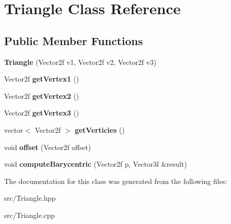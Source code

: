 \hypertarget{class_triangle}{}\section{Triangle Class Reference}
\label{class_triangle}
\subsection*{Public Member Functions}
\begin{DoxyCompactItemize}
\item 
\mbox{\label{class_triangle_ab7e2ea6c13f332ae1545455ab8a8fcec}} 
{\bfseries Triangle} (Vector2f v1, Vector2f v2, Vector2f v3)
\item 
\mbox{\label{class_triangle_acf9ed1087565f30c1958688b77e8fecc}} 
Vector2f {\bfseries get\+Vertex1} ()
\item 
\mbox{\label{class_triangle_aded502a5993f98594e7da89e789edd48}} 
Vector2f {\bfseries get\+Vertex2} ()
\item 
\mbox{\label{class_triangle_a4a3727b262c60cc952f6d2bfe1dff3c4}} 
Vector2f {\bfseries get\+Vertex3} ()
\item 
\mbox{\label{class_triangle_a72b494a788a9a0bea036011d47a79315}} 
vector$<$ Vector2f $>$ {\bfseries get\+Verticies} ()
\item 
\mbox{\label{class_triangle_ab08c9b24ff5e7cc9bc29045d13f4300e}} 
void {\bfseries offset} (Vector2f offset)
\item 
\mbox{\label{class_triangle_affee4378730835d14e1d3db4eb2d8622}} 
void {\bfseries compute\+Barycentric} (Vector2f p, Vector3f \&result)
\end{DoxyCompactItemize}


The documentation for this class was generated from the following files\+:\begin{DoxyCompactItemize}
\item 
src/Triangle.\+hpp\item 
src/Triangle.\+cpp\end{DoxyCompactItemize}
